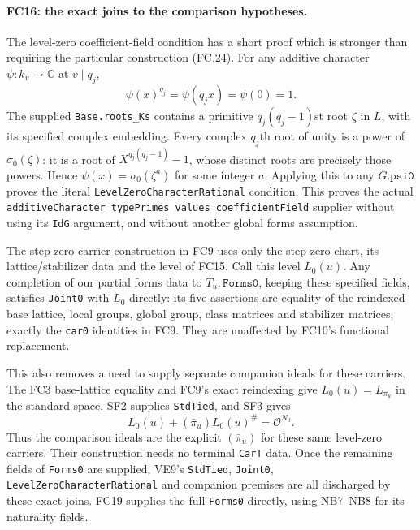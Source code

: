 \paragraph{FC16: the exact joins to the comparison hypotheses.}
The level-zero coefficient-field condition has a short proof which is
stronger than requiring the particular construction (FC.24).
For any additive character $\psi:k_v\to\mathbb C$ at $v\mid q_j$,
\[
 \psi(x)^{q_j}=\psi(q_jx)=\psi(0)=1.                 \tag{FC.31}
\]
The supplied \texttt{Base.roots\_Ks} contains a primitive
$q_j(q_j-1)$st root $\zeta$ in $L$, with its specified complex
embedding. Every complex $q_j$th root of unity is a power of
$\sigma_0(\zeta)$: it is a root of
$X^{q_j(q_j-1)}-1$, whose distinct roots are precisely those powers.
Hence $\psi(x)=\sigma_0(\zeta^a)$ for some integer $a$.
Applying this to any $G.\texttt{psi0}$ proves the literal
\texttt{LevelZeroCharacterRational} condition. This proves the actual
\texttt{additiveCharacter\_typePrimes\_values\_coefficientField}
supplier without using its \texttt{IdG} argument, and without another
global forms assumption.

The step-zero carrier construction in FC9 uses only the step-zero
chart, its lattice/stabilizer data and the level of FC15. Call this
level $L_0(u)$. Any completion of our partial forms data to
$T_u:\texttt{Forms0}$, keeping these specified fields, satisfies
\texttt{Joint0} with $L_0$ directly: its five assertions are equality
of the reindexed base lattice, local groups, global group, class matrices
and stabilizer matrices, exactly the \texttt{car0} identities in FC9.
They are unaffected by FC10's functional replacement.

This also removes a need to supply separate companion ideals for
these carriers. The FC3 base-lattice equality and FC9's exact reindexing
give $L_0(u)=L_{\pi_u}$ in the standard space. SF2 supplies
\texttt{StdTied}, and SF3 gives
\[
 L_0(u)+(\bar\pi_u)L_0(u)^\#=\mathcal O^{N_0}.
 \tag{FC.32}
\]
Thus the comparison ideals are the explicit $(\bar\pi_u)$ for these
same level-zero carriers. Their construction needs no terminal
\texttt{CarT} data. Once the remaining fields of \texttt{Forms0}
are supplied, VE9's \texttt{StdTied}, \texttt{Joint0},
\texttt{LevelZeroCharacterRational} and companion premises are all
discharged by these exact joins. FC19 supplies the full
\texttt{Forms0} directly, using NB7--NB8 for its naturality fields.


